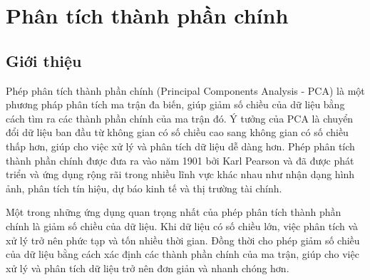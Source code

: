 \documentclass[14pt,oneside,a4paper]{report}
\numberwithin{equation}{section}
\begin{document}
\chapter{ Phân tích thành phần chính }
\section{Giới thiệu}
Phép phân tích thành phần chính (Principal Components Analysis - PCA) là một phương pháp phân tích ma trận đa biến, giúp giảm số chiều của dữ liệu bằng cách tìm ra các thành phần chính của ma trận đó. Ý tưởng của PCA là chuyển đổi dữ liệu ban đầu từ không gian có số chiều cao sang không gian có số chiều thấp hơn, giúp cho việc xử lý và phân tích dữ liệu dễ dàng hơn.
Phép phân tích thành phần chính được đưa ra vào năm 1901 bởi Karl Pearson và đã được phát triển và ứng dụng rộng rãi trong nhiều lĩnh vực khác nhau như nhận dạng hình ảnh, phân tích tín hiệu, dự báo kinh tế và thị trường tài chính.

Một trong những ứng dụng quan trọng nhất của phép phân tích thành phần chính là giảm số chiều của dữ liệu. Khi dữ liệu có số chiều lớn, việc phân tích và xử lý trở nên phức tạp và tốn nhiều thời gian. Đồng thời cho phép giảm số chiều của dữ liệu bằng cách xác định các thành phần chính của ma trận, giúp cho việc xử lý và phân tích dữ liệu trở nên đơn giản và nhanh chóng hơn.
\end{document}
